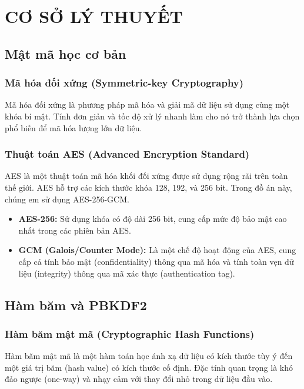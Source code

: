 \chapter{CƠ SỞ LÝ THUYẾT}

\section{Mật mã học cơ bản}
\subsection{Mã hóa đối xứng (Symmetric-key Cryptography)}
Mã hóa đối xứng là phương pháp mã hóa và giải mã dữ liệu sử dụng cùng một khóa bí mật. Tính đơn giản và tốc độ xử lý nhanh làm cho nó trở thành lựa chọn phổ biến để mã hóa lượng lớn dữ liệu.

\subsection{Thuật toán AES (Advanced Encryption Standard)}
AES là một thuật toán mã hóa khối đối xứng được sử dụng rộng rãi trên toàn thế giới. AES hỗ trợ các kích thước khóa 128, 192, và 256 bit. Trong đồ án này, chúng em sử dụng AES-256-GCM.
\begin{itemize}
    \item \textbf{AES-256:} Sử dụng khóa có độ dài 256 bit, cung cấp mức độ bảo mật cao nhất trong các phiên bản AES.
    \item \textbf{GCM (Galois/Counter Mode):} Là một chế độ hoạt động của AES, cung cấp cả tính bảo mật (confidentiality) thông qua mã hóa và tính toàn vẹn dữ liệu (integrity) thông qua mã xác thực (authentication tag).
\end{itemize}

\section{Hàm băm và PBKDF2}
\subsection{Hàm băm mật mã (Cryptographic Hash Functions)}
Hàm băm mật mã là một hàm toán học ánh xạ dữ liệu có kích thước tùy ý đến một giá trị băm (hash value) có kích thước cố định. Đặc tính quan trọng là khó đảo ngược (one-way) và nhạy cảm với thay đổi nhỏ trong dữ liệu đầu vào.

